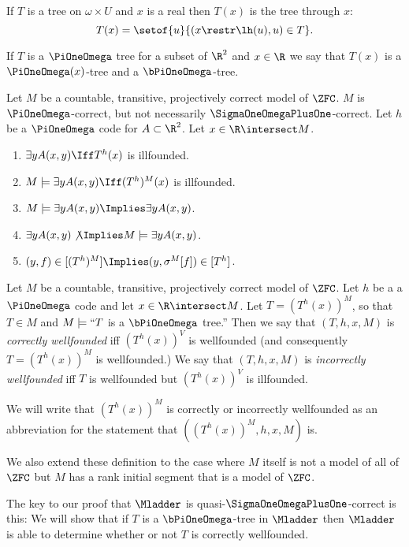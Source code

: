 \documentclass[oneside,12pt]{amsart}
\begin{document}
\begin{definition}
If $T$ is a tree on $\omega\times U$ and $x$ is a real then $T(x)$ is the tree through $x$:
$$T(x) = \setof{u}{(x\restr \lh(u), u) \in T}.$$

If $T$ is a $\PiOneOmega$ tree for a subset of $\R^2$ and $x\in\R$
we say that $T(x)$ is a $\PiOneOmega(x)$-tree
and a $\bPiOneOmega$-tree.
\end{definition}

\begin{remarks}
\label{remarks-about-correctness}
Let $M$ be a countable, transitive, projectively correct model of $\ZFC$.
$M$ is $\PiOneOmega$-correct, but not necessarily $\SigmaOneOmegaPlusOne$-correct.
Let $h$ be a $\PiOneOmega$ code for $A\subset\R^2$.
Let $x\in\R\intersect M$.
\begin{enumerate}
\item $\exists y A(x,y) \Iff T^h(x)$ is illfounded.
\item $M\models \exists y A(x,y) \Iff (T^h)^M(x)$ is illfounded.
\item $M\models \exists y A(x,y) \Implies \exists y A(x,y)$.
\item $\exists y A(x,y) \not\Implies M\models \exists y A(x,y)$.
\item $(y,f)\in[(T^h)^M] \Implies (y, \sigma^M[f]) \in [T^h]$.
\end{enumerate}
\end{remarks}

\begin{definition}
\label{correctly-wellfounded}
Let $M$ be a countable, transitive, projectively correct model of $\ZFC$. 
Let $h$ be a a $\PiOneOmega$ code and let $x\in \R\intersect M$.
Let $T=(T^h(x))^M$, so that $T\in M$ and $M\models ``T$ is a $\bPiOneOmega$ tree.''
Then we say that $(T,h,x,M)$ is \emph{correctly wellfounded} iff 
$(T^h(x))^V$ is wellfounded (and consequently $T = (T^h(x))^M$ is wellfounded.)
We say that $(T,h,x,M)$ is \emph{incorrectly wellfounded} iff $T$ is wellfounded but $(T^h(x))^V$ is illfounded. 

We will write that $(T^h(x))^M$ is correctly or incorrectly wellfounded
as an abbreviation for the statement that 
$\left((T^h(x))^M,h,x,M\right)$ is.

We also extend these definition to the case where $M$ itself is not a model of all of $\ZFC$ but
$M$ has a rank initial segment that is a model of $\ZFC$.
\end{definition}

The key to our proof that $\Mladder$ is quasi-$\SigmaOneOmegaPlusOne$-correct is this:
We will show that if $T$ is a $\bPiOneOmega$-tree in $\Mladder$ then
$\Mladder$ is able to determine whether or not $T$ is correctly wellfounded.
\end{document}

